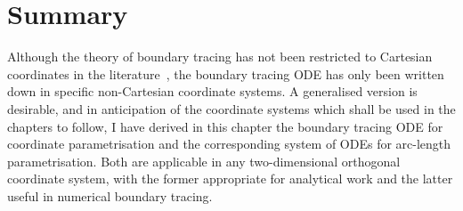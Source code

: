 \section{Summary}
\label{sec:curvilinear.summary}

Although the theory of boundary tracing
has not been restricted to Cartesian coordinates in the literature~\cite{
  anderson-2002-thesis-boundary-tracing-pdes,
  anderson-2007-boundary-tracing-i-theory,
  anderson-2007-boundary-tracing-ii-applications
},
the boundary tracing ODE has only been written down
in specific non-Cartesian coordinate systems.
A generalised version is desirable,
and in anticipation of the coordinate systems
which shall be used in the chapters to follow,
I have derived in this chapter
the boundary tracing ODE for coordinate parametrisation
and the corresponding system of ODEs for arc-length parametrisation.
Both are applicable in any two-dimensional orthogonal coordinate system,
with the former appropriate for analytical work
and the latter useful in numerical boundary tracing.

